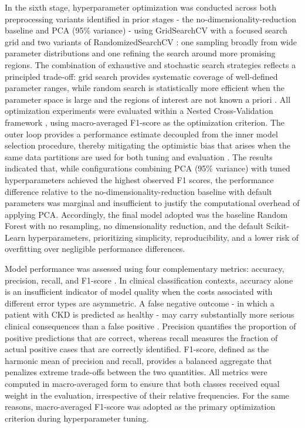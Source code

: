 In the sixth stage, hyperparameter optimization was conducted across both preprocessing variants
identified in prior stages - the no-dimensionality-reduction baseline and PCA (95\% variance) -
using GridSearchCV with a focused search grid and two variants of
RandomizedSearchCV \cite{bergstrabengio2012}: one sampling broadly from wide parameter
distributions and one refining the search around more promising regions. The combination of
exhaustive and stochastic search strategies reflects a principled trade-off: grid search provides
systematic coverage of well-defined parameter ranges, while random search is statistically more
efficient when the parameter space is large and the regions of interest are not known a
priori \cite{bergstrabengio2012}. All optimization experiments were evaluated within a Nested
Cross-Validation framework \cite{cawley2010overfitting}, using macro-averaged F1-score as the
optimization criterion. The outer loop provides a performance estimate decoupled from the inner
model selection procedure, thereby mitigating the optimistic bias that arises when the same data
partitions are used for both tuning and evaluation \cite{cawley2010overfitting}. The results
indicated that, while configurations combining PCA (95\% variance) with tuned hyperparameters
achieved the highest observed F1 scores, the performance difference relative to the
no-dimensionality-reduction baseline with default parameters was marginal and insufficient to
justify the computational overhead of applying PCA. Accordingly, the final model adopted was the
baseline Random Forest with no resampling, no dimensionality reduction, and the default
Scikit-Learn hyperparameters, prioritizing simplicity, reproducibility, and a lower risk of
overfitting over negligible performance differences.

Model performance was assessed using four complementary metrics: accuracy, precision, recall, and
F1-score \cite{faceli2011}. In clinical classification contexts, accuracy alone is an insufficient
indicator of model quality when the costs associated with different error types are asymmetric. A
false negative outcome - in which a patient with CKD is predicted as healthy - may carry
substantially more serious clinical consequences than a false positive \cite{obermeyer2016,deo2015}.
Precision quantifies the proportion of positive predictions that are correct, whereas recall
measures the fraction of actual positive cases that are correctly identified. F1-score, defined as
the harmonic mean of precision and recall, provides a balanced aggregate that penalizes extreme
trade-offs between the two quantities. All metrics were computed in macro-averaged form to ensure
that both classes received equal weight in the evaluation, irrespective of their relative
frequencies. For the same reasons, macro-averaged F1-score was adopted as the primary optimization
criterion during hyperparameter tuning.

